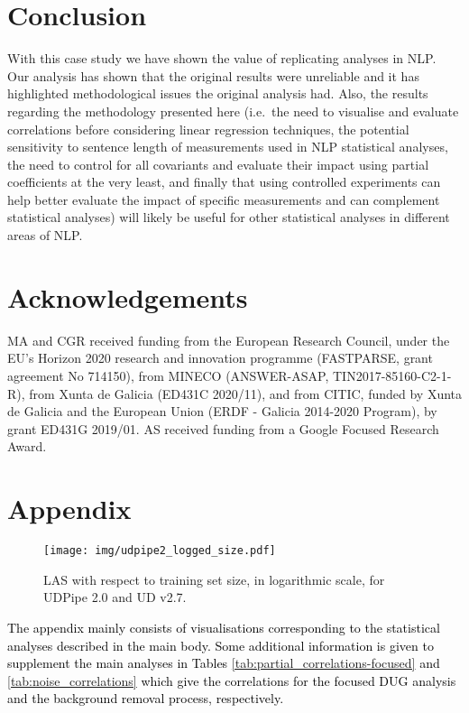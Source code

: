 \documentclass[11pt,a4paper]{article}
\begin{document}
\section{Conclusion}
With this case study we have shown the value of replicating analyses in NLP. Our analysis has shown that the original results were unreliable and it has highlighted methodological issues the original analysis had. Also, the results regarding the methodology presented here (i.e.\ the need to visualise and evaluate correlations before considering linear regression techniques, the potential sensitivity to sentence length of measurements used in NLP statistical analyses, the need to control for all covariants and evaluate their impact using partial coefficients at the very least, and finally that using controlled experiments can help better evaluate the impact of specific measurements and can complement statistical analyses) will likely be useful for other statistical analyses in different areas of NLP.

\section*{Acknowledgements}
MA and CGR received funding from the European Research Council, under the EU's Horizon 2020 research and innovation programme (FASTPARSE, grant agreement No 714150), from MINECO (ANSWER-ASAP, TIN2017-85160-C2-1-R), from Xunta de Galicia (ED431C 2020/11), and from %
CITIC, funded by Xunta de Galicia and the European Union (ERDF - Galicia 2014-2020 Program), by grant ED431G 2019/01. AS received funding from a Google Focused Research Award.


\appendix
\section{Appendix}
\label{sec:appendix}
\begin{figure}[bp!]
    \centering
    \texttt{[image: img/udpipe2\_logged\_size.pdf]}
    \caption{LAS with respect to training set size, in logarithmic scale, for UDPipe 2.0 and UD v2.7.}
    \label{fig:size_logged}
\end{figure}
\textcolor{black}{The appendix mainly consists of visualisations corresponding to the statistical analyses described in the main body. Some additional information is given to supplement the main analyses in Tables \ref{tab:partial_correlations-focused} and \ref{tab:noise_correlations} which give the correlations for the focused DUG analysis and the background removal process, respectively.}
\end{document}
